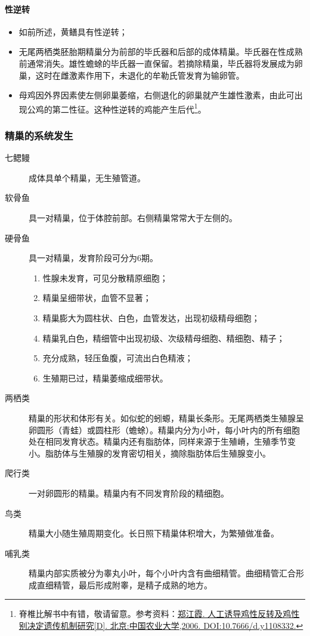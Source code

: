 \paragraph{性逆转}

\begin{itemize}
	\item 如前所述，黄鳝具有性逆转；
	\item 无尾两栖类胚胎期精巢分为前部的毕氏器和后部的成体精巢。毕氏器在性成熟前通常消失。雄性蟾蜍的毕氏器一直保留。若摘除精巢，毕氏器将发展成为卵巢，这时在雌激素作用下，未退化的牟勒氏管发育为输卵管。
	\item 母鸡因外界因素使左侧卵巢萎缩，右侧退化的卵巢就产生雄性激素，由此可出现公鸡的第二性征。这种性逆转的鸡能产生后代\footnote{脊椎比解书中有错，敬请留意。参考资料：\href{https://d.wanfangdata.com.cn/thesis/Y1108332}{郑江霞. 人工诱导鸡性反转及鸡性别决定遗传机制研究[D]. 北京:中国农业大学,2006. DOI:10.7666/d.y1108332.}}。
\end{itemize}

\subsubsection{精巢的系统发生}

\begin{description}
	\item[七鳃鳗] 成体具单个精巢，无生殖管道。
	\item[软骨鱼] 具一对精巢，位于体腔前部。右侧精巢常常大于左侧的。
	\item[硬骨鱼] 具一对精巢，发育阶段可分为6期。

	\begin{enumerate}[label=\Roman*]
		\item 性腺未发育，可见分散精原细胞；
		\item 精巢呈细带状，血管不显著；
		\item 精巢膨大为圆柱状、白色，血管发达，出现初级精母细胞；
		\item 精巢乳白色，精细管中出现初级、次级精母细胞、精细胞、精子；
		\item 充分成熟，轻压鱼腹，可流出白色精液；
		\item 生殖期已过，精巢萎缩成细带状。
	\end{enumerate}

	\item[两栖类] 精巢的形状和体形有关。如似蛇的蚓螈，精巢长条形。无尾两栖类生殖腺呈卵圆形（青蛙）或圆柱形（蟾蜍）。精巢内分为小叶，每小叶内的所有细胞处在相同发育状态。精巢内还有脂肪体，同样来源于生殖嵴，生殖季节变小。脂肪体与生殖腺的发育密切相关，摘除脂肪体后生殖腺变小。
	\item[爬行类] 一对卵圆形的精巢。精巢内有不同发育阶段的精细胞。
	\item[鸟类] 精巢大小随生殖周期变化。长日照下精巢体积增大，为繁殖做准备。
	\item[哺乳类] 精巢内部实质被分为睾丸小叶，每个小叶内含有曲细精管。曲细精管汇合形成直细精管，最后形成附睾，是精子成熟的地方。
\end{description}

